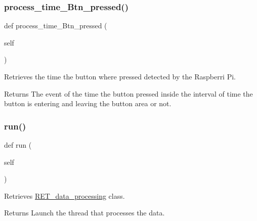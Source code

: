 \subsubsection{\texorpdfstring{process\+\_\+time\+\_\+\+Btn\+\_\+pressed()}{process\_time\_Btn\_pressed()}}
{\footnotesize\ttfamily def process\+\_\+time\+\_\+\+Btn\+\_\+pressed (\begin{DoxyParamCaption}\item[{}]{self }\end{DoxyParamCaption})}



Retrieves the time the button where pressed detected by the Raspberri Pi. 

\begin{DoxyReturn}{Returns}
The event of the time the button pressed inside the interval of time the button is entering and leaving the button area or not. 
\end{DoxyReturn}
\mbox{\label{classRET__data__processing_1_1RET__data__processing_ad22709b2e67308af35f55680d5a026e0}} 
\subsubsection{\texorpdfstring{run()}{run()}}
{\footnotesize\ttfamily def run (\begin{DoxyParamCaption}\item[{}]{self }\end{DoxyParamCaption})}



Retrieves \hyperlink{classRET__data__processing_1_1RET__data__processing}{R\+E\+T\+\_\+data\+\_\+processing} class. 

\begin{DoxyReturn}{Returns}
Launch the thread that processes the data. 
\end{DoxyReturn}
\mbox{\label{classRET__data__processing_1_1RET__data__processing_a53cc9f2963d8567e8f2be4663fbe2d92}} 
